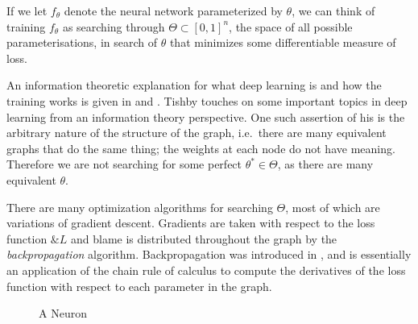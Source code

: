 If we let $f_\theta$ denote the neural network parameterized by
$\theta$, we can think of training $f_\theta$ as searching through
$\Theta \subset [0, 1]^n$, the space of all possible
parameterisations, in search of $\theta$ that minimizes some
differentiable measure of loss.

An information theoretic explanation for what deep learning is and how
the training works is given in \cite{ref:tishby-2015} and
\cite{ref:tishby-2017}. Tishby touches on some important topics in
deep learning from an information theory perspective.  One such
assertion of his is the arbitrary nature of the structure of the
graph, i.e.\ there are many equivalent graphs that do the same thing;
the weights at each node do not have meaning. Therefore we are not
searching for some perfect $\theta^* \in \Theta$, as there are many
equivalent $\theta$.

There are many optimization algorithms for searching $\Theta$, most of
which are variations of gradient descent. Gradients are taken with
respect to the loss function $\&L$ and blame is distributed throughout
the graph by the \textit{backpropagation} algorithm. Backpropagation
was introduced in \cite{ref:rumelhart-1986}, and is essentially an
application of the chain rule of calculus to compute the derivatives
of the loss function with respect to each parameter in the graph.

\begin{figure}[H] \centering
  \caption{A Neuron}
  \label{fig:node_of_nn}
\end{figure}

